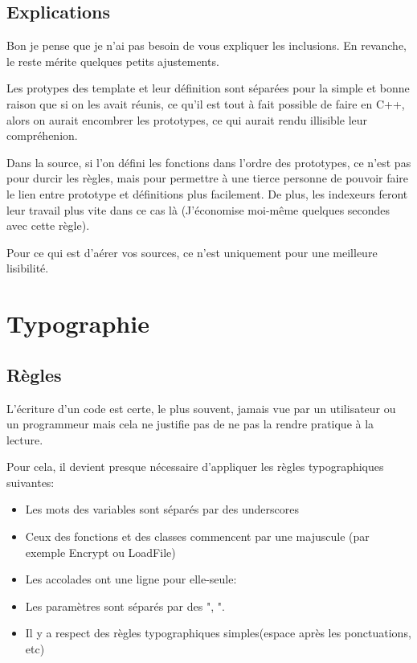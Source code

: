 \documentclass[a4paper,12pt]{report}
\begin{document}
\subsection{Explications}
Bon je pense que je n'ai pas besoin de vous expliquer les inclusions. En 
revanche, le reste mérite quelques petits ajustements.\newline

Les protypes des template et leur définition sont séparées pour la simple 
et bonne raison que si on les avait réunis, ce qu'il est tout à fait 
possible de faire en C++, alors on aurait encombrer les prototypes, ce 
qui aurait rendu illisible leur compréhenion.\newline

Dans la source, si l'on défini les fonctions dans l'ordre des prototypes, 
ce n'est pas pour durcir les règles, mais pour permettre à une tierce 
personne de pouvoir faire le lien entre prototype et définitions plus 
facilement. De plus, les indexeurs feront leur travail plus vite 
dans ce cas là (J'économise moi-même quelques secondes avec cette 
règle).\newline

Pour ce qui est d'aérer vos sources, ce n'est uniquement pour une 
meilleure lisibilité.


\section{Typographie}
\subsection{Règles}
L'écriture d'un code est certe, le plus souvent, jamais vue par un 
utilisateur ou un programmeur mais cela ne justifie pas de ne pas la 
rendre pratique à la lecture.\newline

Pour cela, il devient presque nécessaire d'appliquer les règles 
typographiques suivantes: \newline

\begin{itemize}
    \item Les mots des variables sont séparés par des underscores
    \item Ceux des fonctions et des classes commencent par une majuscule 
          (par exemple Encrypt ou LoadFile)
    \item Les accolades ont une ligne pour elle-seule:
        \begin{center}
            \begin{minipage}{2.1764in}
                
            \end{minipage}
        \end{center}
    \item Les paramètres sont séparés par des ", ".
    \item Il y a respect des règles typographiques simples(espace après 
          les ponctuations, etc)
\end{itemize}
\end{document}
